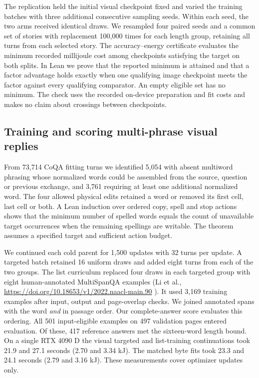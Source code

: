 \documentclass[12pt,a4paper]{article}
\providecommand{\DIFadd}[1]{{\protect\color{blue} \sf #1}} %
\begin{document}
\DIFadd{The replication held the initial visual checkpoint fixed and varied the training batches with three additional consecutive sampling seeds. Within each seed, the two arms received identical draws. We resampled four paired seeds and a common set of stories with replacement 100,000 times for each length group, retaining all turns from each selected story. The accuracy--energy certificate evaluates the minimum recorded millijoule cost among checkpoints satisfying the target on both splits. In Lean we prove that the reported minimum is attained and that a factor advantage holds exactly when one qualifying image checkpoint meets the factor against every qualifying comparator. An empty eligible set has no minimum. The check uses the recorded on-device preparation and fit costs and makes no claim about crossings between checkpoints.
}

\subsection*{\DIFadd{Training and scoring multi-phrase visual replies}}
\DIFadd{From 73,714 CoQA fitting turns we identified 5,054 with absent multiword phrasing whose normalized words could be assembled from the source, question or previous exchange, and 3,761 requiring at least one additional normalized word. The four allowed physical edits retained a word or removed its first cell, last cell or both. A Lean induction over ordered copy, spell and stop actions shows that the minimum number of spelled words equals the count of unavailable target occurrences when the remaining spellings are writable. The theorem assumes a specified target and sufficient action budget.
}

\DIFadd{We continued each cold parent for 1,500 updates with 32 turns per update. A targeted batch retained 16 uniform draws and added eight turns from each of the two groups. The list curriculum replaced four draws in each targeted group with eight human-annotated MultiSpanQA examples (Li et al., }\url{https://doi.org/10.18653/v1/2022.naacl-main.90}\DIFadd{). It used 3,169 training examples after input, output and page-overlap checks. We joined annotated spans with the word \emph{and} in passage order. Our complete-answer score evaluates this ordering. All 501 input-eligible examples on 497 validation pages entered evaluation. Of these, 417 reference answers met the sixteen-word length bound. On a single RTX 4090 D the visual targeted and list-training continuations took 21.9 and 27.1 seconds (2.70 and 3.34 kJ). The matched byte fits took 23.3 and 24.1 seconds (2.79 and 3.16 kJ). These measurements cover optimizer updates only.
}
\end{document}
